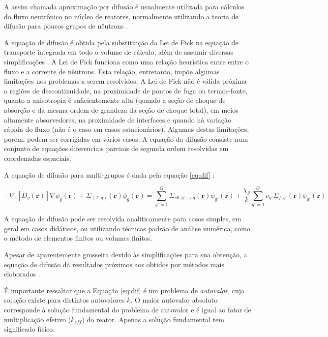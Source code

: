 A assim chamada aproximação por difusão é usualmente utilizada para cálculos
do fluxo neutrônico no núcleo de reatores, normalmente utilizando a teoria
de difusão para poucos grupos de nêutrons \cite{Hebert2009}.

A equação de difusão é obtida pela substituição da Lei de Fick na equação de
transporte integrada em todo o volume de cálculo, além de assumir
diversas simplificações \cite{Theler2013b}. A Lei de Fick funciona como
uma relação heurística entre entre o fluxo e a corrente de nêutrons.
Esta relação, entretanto, impõe algumas limitações nos problemas a serem
resolvidos. A Lei de Fick não é válida próxima a regiões
de descontinuidade, na proximidade de pontos de fuga ou termos-fonte, quanto
a anisotropia é suficientemente alta (quando a seção de choque
de absorção e da mesma ordem de grandeza da seção de choque total), em
meios altamente absorvedores, na proximidade de interfaces e quando há variação
rápida do fluxo (não é o caso em casos estacionários).
Algumas destas limitações, porém, podem ser corrigidas
em vários casos. A equação da difusão consiste
num conjunto de equações diferenciais parciais de segunda ordem resolvidas
em coordenadas espaciais.

A equação de difusão para multi-grupos é dada pela equação \ref{eq:dif} \cite{Demaziere2014}:

\begin{equation}
  \label{eq:dif}
  -\nabla.[D_g(\mathbf{r})]\nabla \phi_g(\mathbf{r})+ \Sigma_{(T,g)}(\mathbf{r})\phi_g(\mathbf{r}) =
  \sum_{g'=1}^{G} \Sigma_{s0,g'\rightarrow g}(\mathbf{r})\phi_{g'}(\mathbf{r}) +
  \frac{\chi_g}{k}\sum_{g'=1}^{G}\nu_{g'}\Sigma_{f,g'}(\mathbf{r})\phi_{g'}(\mathbf{r})
\end{equation}


A equação de difusão pode ser resolvida analiticamente para casos simples, em geral em
casos didáticos, ou utilizando técnicas padrão de análise numérica, como o método de
elementos finitos ou volumes finitos.

Apesar de aparentemente grosseira devido às simplificações para sua obtenção, a equação
de difusão dá resultados próximos aos obtidos por métodos mais elaborados \cite{Theler2013b}.

É importante ressaltar que a Equação \ref{eq:dif} é um problema de \textit{autovalor}, cuja
solução existe para distintos autovalores $k$. O maior autovalor absoluto corresponde à
solução fundamental do problema de autovalor e é igual ao fator de multiplicação
efetivo ($k_{eff}$) do reator. Apenas a solução fundamental tem significado físico.


